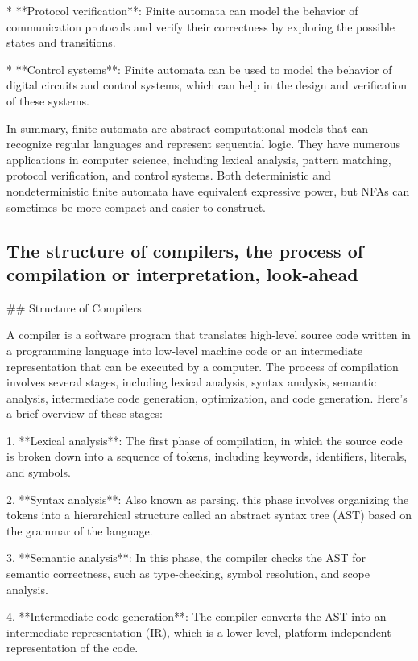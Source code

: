 \documentclass{article}
\begin{document}
* **Protocol verification**: Finite automata can model the behavior of communication protocols and verify their correctness by exploring the possible states and transitions.

* **Control systems**: Finite automata can be used to model the behavior of digital circuits and control systems, which can help in the design and verification of these systems.

In summary, finite automata are abstract computational models that can recognize regular languages and represent sequential logic. They have numerous applications in computer science, including lexical analysis, pattern matching, protocol verification, and control systems. Both deterministic and nondeterministic finite automata have equivalent expressive power, but NFAs can sometimes be more compact and easier to construct.


\subsection{The structure of compilers, the process of compilation or interpretation, look-ahead}

## Structure of Compilers

A compiler is a software program that translates high-level source code written in a programming language into low-level machine code or an intermediate representation that can be executed by a computer. The process of compilation involves several stages, including lexical analysis, syntax analysis, semantic analysis, intermediate code generation, optimization, and code generation. Here's a brief overview of these stages:

1. **Lexical analysis**: The first phase of compilation, in which the source code is broken down into a sequence of tokens, including keywords, identifiers, literals, and symbols.

2. **Syntax analysis**: Also known as parsing, this phase involves organizing the tokens into a hierarchical structure called an abstract syntax tree (AST) based on the grammar of the language.

3. **Semantic analysis**: In this phase, the compiler checks the AST for semantic correctness, such as type-checking, symbol resolution, and scope analysis.

4. **Intermediate code generation**: The compiler converts the AST into an intermediate representation (IR), which is a lower-level, platform-independent representation of the code.
\end{document}
